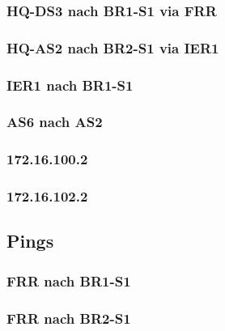 \subsubsection{HQ-DS3 nach BR1-S1 via FRR}


\subsubsection{HQ-AS2 nach BR2-S1 via IER1}


\subsubsection{IER1 nach BR1-S1}


\subsubsection{AS6 nach AS2}


\subsubsection{172.16.100.2}


\subsubsection{172.16.102.2}



\subsection{Pings}
\subsubsection{FRR nach BR1-S1}



\subsubsection{FRR nach BR2-S1}




